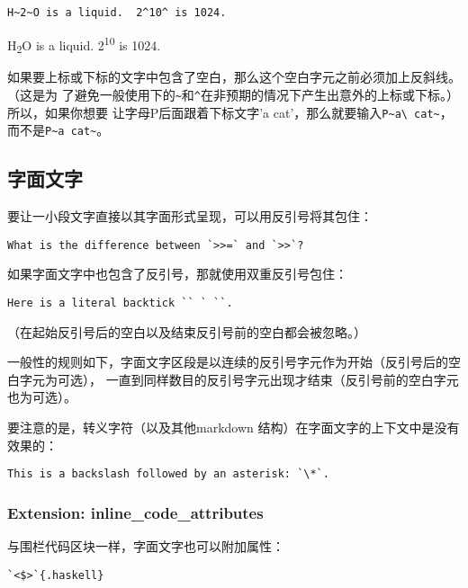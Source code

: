 \documentclass[fancyhdr,bookmark]{ctexbook}
\begin{document}
\begin{lstlisting}
H~2~O is a liquid.  2^10^ is 1024.
\end{lstlisting}

H\textsubscript{2}O is a liquid. 2\textsuperscript{10} is 1024.

如果要上标或下标的文字中包含了空白，那么这个空白字元之前必须加上反斜线。（这是为
了避免一般使用下的\lstinline!~!和\lstinline!^!在非预期的情况下产生出意外的上标或下标。）所以，如果你想要
让字母P后面跟着下标文字'a
cat'，那么就要输入\lstinline!P~a\ cat~!，而不是\lstinline!P~a cat~!。

\subsection{字面文字}\label{ux5b57ux9762ux6587ux5b57}

要让一小段文字直接以其字面形式呈现，可以用反引号将其包住：

\begin{lstlisting}
What is the difference between `>>=` and `>>`?
\end{lstlisting}

如果字面文字中也包含了反引号，那就使用双重反引号包住：

\begin{lstlisting}
Here is a literal backtick `` ` ``.
\end{lstlisting}

（在起始反引号后的空白以及结束反引号前的空白都会被忽略。）

一般性的规则如下，字面文字区段是以连续的反引号字元作为开始（反引号后的空白字元为可选），
一直到同样数目的反引号字元出现才结束（反引号前的空白字元也为可选）。

要注意的是，转义字符（以及其他markdown
结构）在字面文字的上下文中是没有效果的：

\begin{lstlisting}
This is a backslash followed by an asterisk: `\*`.
\end{lstlisting}

\subsubsection{Extension:
inline\_code\_attributes}\label{extension-inlineux5fcodeux5fattributes}

与围栏代码区块一样，字面文字也可以附加属性：

\begin{lstlisting}
`<$>`{.haskell}
\end{lstlisting}
\end{document}
